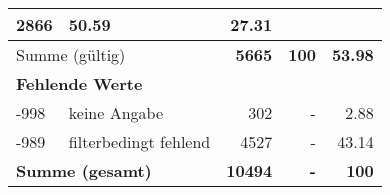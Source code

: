\begin{longtable}{lXrrr}
       \num{2866} &
       \num[round-mode=places,round-precision=2]{50.59} &
         \num[round-mode=places,round-precision=2]{27.31} \\
     \midrule
     \multicolumn{2}{l}{Summe (gültig)} &
       \textbf{\num{5665}} &
     \textbf{\num{100}} &
       \textbf{\num[round-mode=places,round-precision=2]{53.98}} \\
     \multicolumn{5}{l}{\textbf{Fehlende Werte}}\\
       -998 &
       keine Angabe &
         \num{302} &
        - &
         \num[round-mode=places,round-precision=2]{2.88} \\
       -989 &
       filterbedingt fehlend &
         \num{4527} &
        - &
         \num[round-mode=places,round-precision=2]{43.14} \\
     \midrule
     \multicolumn{2}{l}{\textbf{Summe (gesamt)}} &
          \textbf{\num{10494}} &
        \textbf{-} &
        \textbf{\num{100}} \\
     \bottomrule
     \end{longtable}
     
